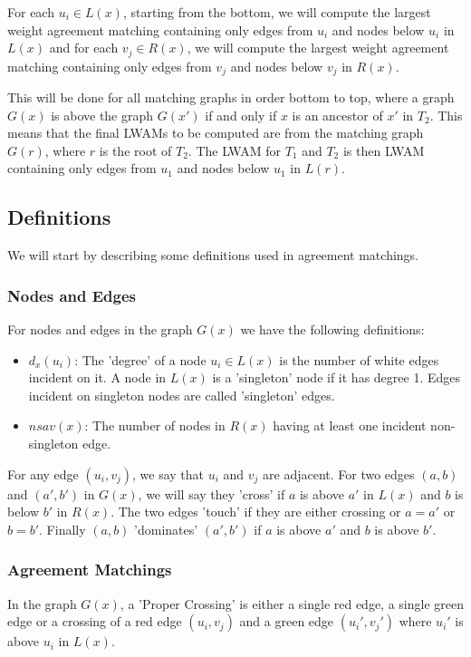 For each $u_i \in L(x)$, starting from the bottom, we will compute the largest weight agreement matching containing only edges from $u_i$ and nodes below $u_i$ in $L(x)$ and for each $v_j \in R(x)$, we will compute the largest weight agreement matching containing only edges from $v_j$ and nodes below $v_j$ in $R(x)$.

This will be done for all matching graphs in order bottom to top, where a graph $G(x)$ is above the graph $G(x')$ if and only if $x$ is an ancestor of $x'$ in $T_2$. This means that the final LWAMs to be computed are from the matching graph $G(r)$, where $r$ is the root of $T_2$. The LWAM for $T_1$ and $T_2$ is then LWAM containing only edges from $u_1$ and nodes below $u_1$ in $L(r)$.

\subsection{Definitions}
We will start by describing some definitions used in agreement matchings.

\subsubsection{Nodes and Edges}
For nodes and edges in the graph $G(x)$ we have the following definitions:
\begin{itemize}
	\item $d_x(u_i)$: The 'degree' of a node $u_i \in L(x)$ is the number of white edges incident on it.
	\subitem A node in $L(x)$ is a 'singleton' node if it has degree 1.
	\subitem Edges incident on singleton nodes are called 'singleton' edges.
	\item $nsav(x)$: The number of nodes in $R(x)$ having at least one incident non-singleton edge.
\end{itemize}

For any edge $(u_i, v_j)$, we say that $u_i$ and $v_j$ are adjacent. For two edges $(a,b)$ and $(a',b')$ in $G(x)$, we will say they 'cross' if $a$ is above $a'$ in $L(x)$ and $b$ is below $b'$ in $R(x)$. The two edges 'touch' if they are either crossing or $a=a'$ or $b=b'$. Finally $(a,b)$ 'dominates' $(a',b')$ if $a$ is above $a'$ and $b$ is above $b'$.

\subsubsection{Agreement Matchings}
In the graph $G(x)$, a 'Proper Crossing' is either a single red edge, a single green edge or a crossing of a red edge $(u_i,v_j)$ and a green edge $(u_i',v_j')$ where $u_i'$ is above $u_i$ in $L(x)$.

